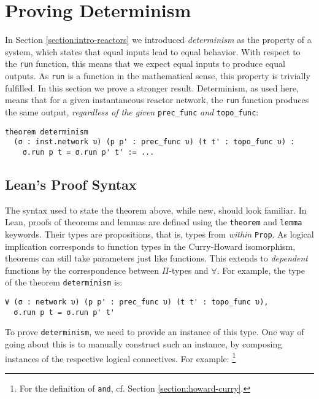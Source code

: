 \section{Proving Determinism}
\label{section:determinism}

In Section \ref{section:intro-reactors} we introduced \emph{determinism} as the property of a system, which states that equal inputs lead to equal behavior.
With respect to the \lstinline{run} function, this means that we expect equal inputs to produce equal outputs.
As \lstinline{run} is a function in the mathematical sense, this property is trivially fulfilled.
In this section we prove a stronger result.
Determinism, as used here, means that for a given instantaneous reactor network, the \lstinline{run} function produces the same output, \emph{regardless of the given} \lstinline{prec_func} \emph{and} \lstinline{topo_func}:

\begin{lstlisting}
theorem determinism 
  (σ : inst.network υ) (p p' : prec_func υ) (t t' : topo_func υ) : 
    σ.run p t = σ.run p' t' := ...
\end{lstlisting}

\subsection{Lean's Proof Syntax}

The syntax used to state the theorem above, while new, should look familiar.
In Lean, proofs of theorems and lemmas are defined using the \verb|theorem| and \verb|lemma| keywords.
Their types are propositions, that is, types from \emph{within} \verb|Prop|.
As logical implication corresponds to function types in the Curry-Howard isomorphism, theorems can still take parameters just like functions.
This extends to \emph{dependent} functions by the correspondence between $\Pi$-types and $\forall$.
For example, the type of the theorem \lstinline{determinism} is:

\begin{lstlisting}
∀ (σ : network υ) (p p' : prec_func υ) (t t' : topo_func υ), 
  σ.run p t = σ.run p' t'
\end{lstlisting}

\noindent To prove \lstinline{determinism}, we need to provide an instance of this type.
One way of going about this is to manually construct such an instance, by composing instances of the respective logical connectives.
For example: \footnote{For the definition of \lstinline{and}, cf. Section \ref{section:howard-curry}.}

